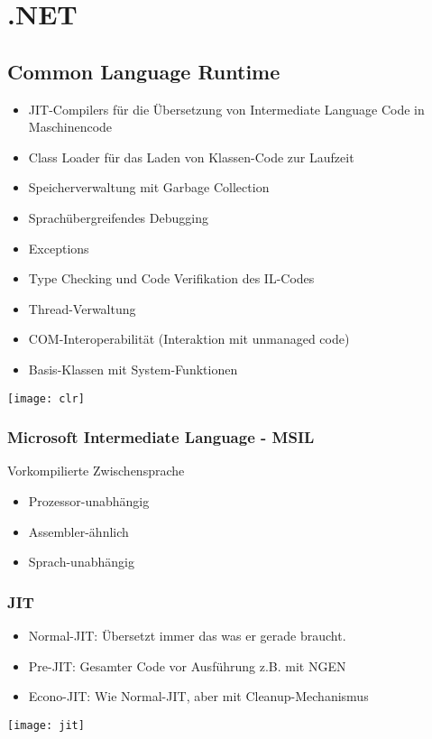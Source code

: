 
\section{.NET}

\begin{multicols*}{2}

\subsection{Common Language Runtime}
\begin{itemize}
    \item JIT-Compilers für die Übersetzung von Intermediate Language Code in Maschinencode
    \item Class Loader für das Laden von Klassen-Code zur Laufzeit
    \item Speicherverwaltung mit Garbage Collection
    \item Sprachübergreifendes Debugging
    \item Exceptions
    \item Type Checking und Code Verifikation des IL-Codes
    \item Thread-Verwaltung
    \item COM-Interoperabilität (Interaktion mit unmanaged code)
    \item Basis-Klassen mit System-Funktionen
\end{itemize}
\texttt{[image: clr]}
\subsubsection{Microsoft Intermediate Language - MSIL}
Vorkompilierte Zwischensprache
\begin{itemize}
    \item Prozessor-unabhängig
    \item Assembler-ähnlich
    \item Sprach-unabhängig
\end{itemize}
\subsubsection{JIT}
\begin{itemize}
    \item Normal-JIT: Übersetzt immer das was er gerade braucht.
    \item Pre-JIT: Gesamter Code vor Ausführung z.B. mit NGEN
    \item Econo-JIT: Wie Normal-JIT, aber mit Cleanup-Mechanismus
\end{itemize}
\texttt{[image: jit]}



\end{multicols*}
